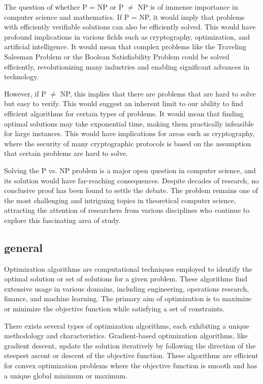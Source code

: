 The question of whether P = NP or P $\neq$ NP is of immense importance in computer science and mathematics. If P = NP, it would imply that problems with efficiently verifiable solutions can also be efficiently solved. This would have profound implications in various fields such as cryptography, optimization, and artificial intelligence. It would mean that complex problems like the Traveling Salesman Problem or the Boolean Satisfiability Problem could be solved efficiently, revolutionizing many industries and enabling significant advances in technology.

However, if P $\neq$ NP, this implies that there are problems that are hard to solve but easy to verify. This would suggest an inherent limit to our ability to find efficient algorithms for certain types of problems. It would mean that finding optimal solutions may take exponential time, making them practically infeasible for large instances. This would have implications for areas such as cryptography, where the security of many cryptographic protocols is based on the assumption that certain problems are hard to solve.

Solving the P vs. NP problem is a major open question in computer science, and its solution would have far-reaching consequences. Despite decades of research, no conclusive proof has been found to settle the debate. The problem remains one of the most challenging and intriguing topics in theoretical computer science, attracting the attention of researchers from various disciplines who continue to explore this fascinating area of study.


\subsection{general}
Optimization algorithms are computational techniques employed to identify the optimal solution or set of solutions for a given problem. These algorithms find extensive usage in various domains, including engineering, operations research, finance, and machine learning. The primary aim of optimization is to maximize or minimize the objective function while satisfying a set of constraints.

There exists several types of optimization algorithms, each exhibiting a unique methodology and characteristics.   Gradient-based optimization algorithms, like gradient descent, update the solution iteratively by following the direction of the steepest ascent or descent of the objective function. These algorithms are efficient for convex optimization problems where the objective function is smooth and has a unique global minimum or maximum.

